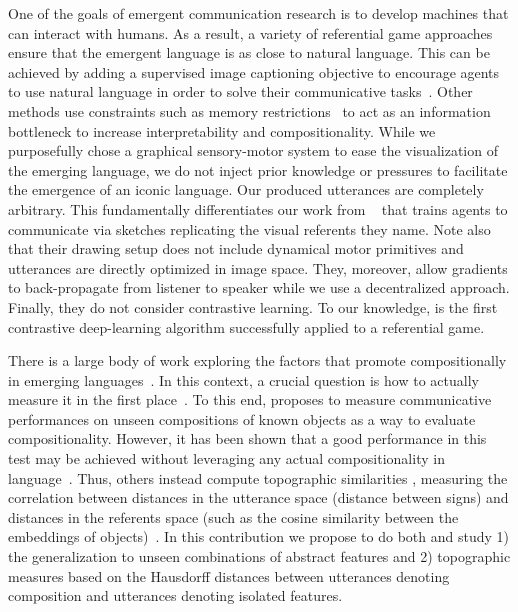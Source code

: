 One of the goals of emergent communication research is to develop machines that can interact with humans. As a result, a variety of referential game approaches ensure that the emergent language is as close to natural language. This can be achieved by adding a supervised image captioning objective to encourage agents to use natural language in order to solve their communicative tasks~\citep{havrylov2017emergence,lazaridou2017multiagent}. Other methods use constraints such as memory restrictions~\citep{kottur2017natural} to act as an information bottleneck to increase interpretability and compositionality. While we purposefully chose a graphical sensory-motor system to ease the visualization of the emerging language, we do not inject prior knowledge or pressures to facilitate the emergence of an iconic language. Our produced utterances are completely arbitrary. This fundamentally differentiates our work from ~\citet{mihai2021learning} that trains agents to communicate via sketches replicating the visual referents they name. Note also that their drawing setup does not include dynamical motor primitives and utterances are directly optimized in image space. They, moreover, allow gradients to back-propagate from listener to speaker while we use a decentralized approach. Finally, they do not consider contrastive learning. To our knowledge, \curves is the first contrastive deep-learning algorithm successfully applied to a referential game.

There is a large body of work exploring the factors that promote
compositionally in emerging languages~\citep{kottur2017natural,li2019ease,rodriguez-luna-etal-2020-internal,Ren2020Compositional,chaabouni2020compositionality,gupta-etal-2020-compositionality}. In this context, a crucial question is how to actually measure it in the first place~\citep{mu2021emergent}. To this end, \citep{choi2018compositional} proposes to measure communicative performances on unseen compositions of known objects as a way to evaluate compositionality. However, it has been shown that a good performance in this test may be achieved without leveraging any actual compositionality in language~\citep{andreas2019measuring, chaabouni2020compositionality}. Thus, others instead compute topographic similarities \citep{brighton2006understanding}, measuring the correlation between distances in the utterance space (distance between signs) and distances in the referents space (such as the cosine similarity between the embeddings of objects)~\citep{lazaridou2018emergence}. In this contribution we propose to do both and study 1) the generalization to unseen combinations of abstract features and 2) topographic measures based on the Hausdorff distances between utterances denoting composition and utterances denoting isolated features. 

